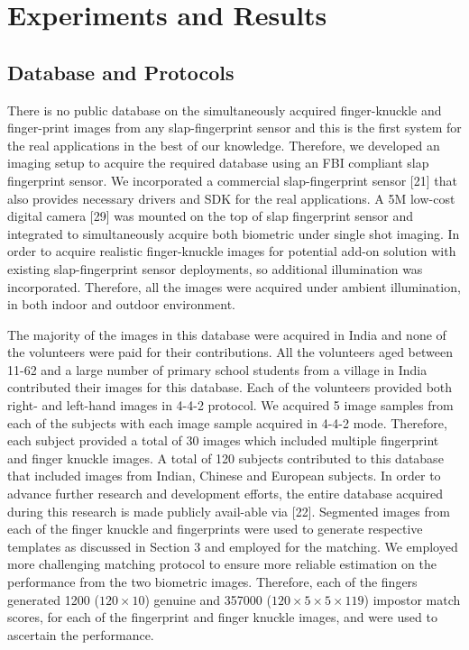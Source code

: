 \section{Experiments and Results}

\subsection{Database and Protocols}

There is no public database on the simultaneously acquired finger-knuckle and finger-print images from any slap-fingerprint sensor and this is the first system for the real applications in the best of our knowledge. Therefore, we developed an imaging setup to acquire the required database using an FBI compliant slap fingerprint sensor. We incorporated a commercial slap-fingerprint sensor [21] that also provides necessary drivers and SDK for the real applications. A 5M low-cost digital camera [29] was mounted on the top of slap fingerprint sensor and integrated to simultaneously acquire both biometric under single shot imaging. In order to acquire realistic finger-knuckle images for potential add-on solution with existing slap-fingerprint sensor deployments, so additional illumination was incorporated. Therefore, all the images were acquired under ambient illumination, in both indoor and outdoor environment.

The majority of the images in this database were acquired in India and none of the volunteers were paid for their contributions. All the volunteers aged between 11-62 and a large number of primary school students from a village in India contributed their images for this database. Each of the volunteers provided both right- and left-hand images in 4-4-2 protocol. We acquired 5 image samples from each of the subjects with each image sample acquired in 4-4-2 mode. Therefore, each subject provided a total of 30 images which included multiple fingerprint and finger knuckle images. A total of 120 subjects contributed to this database that included images from Indian, Chinese and European subjects. In order to advance further research and development efforts, the entire database acquired during this research is made publicly avail-able via [22]. Segmented images from each of the finger knuckle and fingerprints were used to generate respective templates as discussed in Section 3 and employed for the matching. We employed more challenging matching protocol to ensure more reliable estimation on the performance from the two biometric images. Therefore, each of the fingers generated 1200 ($120 \times 10$) genuine and 357000 ($120 \times 5 \times 5 \times 119$) impostor match scores, for each of the fingerprint and finger knuckle images, and were used to ascertain the performance.  